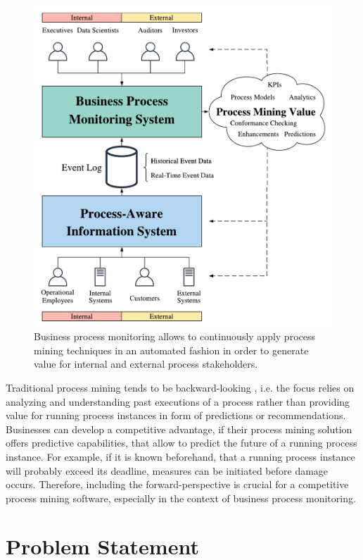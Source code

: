 \begin{figure}[htbp!]
	\centering
	\includegraphics[width=\textwidth]{figures/process-monitoring}
	\caption{Business process monitoring allows to continuously apply process mining techniques in an automated fashion in order to generate value for internal and external process stakeholders.}
	\label{fig:process-monitoring}
\end{figure}

Traditional process mining tends to be backward-looking \cite{DBLP:conf/scsc/Aalst18}, i.e. the focus relies on analyzing and understanding past executions of a process rather than providing value for running process instances in form of predictions or recommendations.
Businesses can develop a competitive advantage, if their process mining solution offers predictive capabilities, that allow to predict the future of a running process instance.
For example, if it is known beforehand, that a running process instance will probably exceed its deadline, measures can be initiated before damage occurs.
Therefore, including the forward-perspective is crucial for a competitive process mining software, especially in the context of business process monitoring.

\section{Problem Statement}

